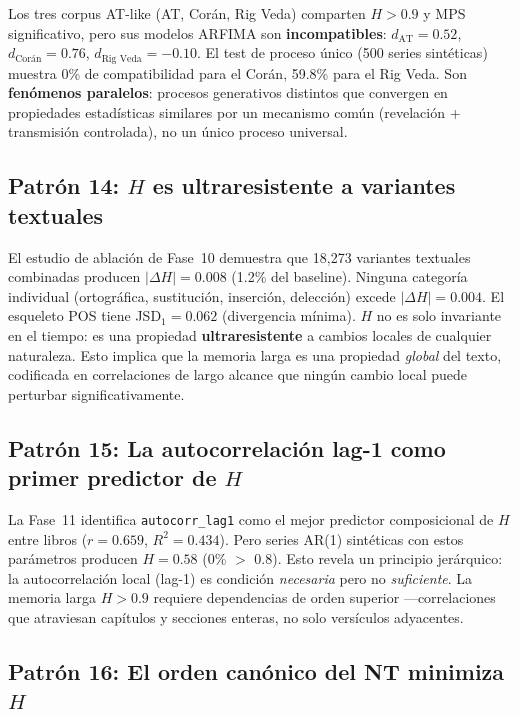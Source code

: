 \documentclass[12pt,a4paper]{article}
\begin{document}
Los tres corpus AT-like (AT, Cor\'an, Rig Veda) comparten $H > 0.9$ y MPS
significativo, pero sus modelos ARFIMA son \textbf{incompatibles}: $d_{\text{AT}} = 0.52$,
$d_{\text{Cor\'an}} = 0.76$, $d_{\text{Rig Veda}} = -0.10$. El test de proceso
\'unico (500 series sint\'eticas) muestra 0\% de compatibilidad para el Cor\'an,
59.8\% para el Rig Veda. Son \textbf{fen\'omenos paralelos}: procesos generativos
distintos que convergen en propiedades estad\'isticas similares por un mecanismo
com\'un (revelaci\'on + transmisi\'on controlada), no un \'unico proceso universal.


\subsection{Patr\'on 14: $H$ es ultraresistente a variantes textuales}

El estudio de ablaci\'on de Fase~10 demuestra que 18,273 variantes
textuales combinadas producen $|\Delta H| = 0.008$ (1.2\% del baseline).
Ninguna categor\'ia individual (ortogr\'afica, sustituci\'on, inserci\'on,
delecci\'on) excede $|\Delta H| = 0.004$. El esqueleto POS tiene
JSD$_1 = 0.062$ (divergencia m\'inima). $H$ no es solo invariante
en el tiempo: es una propiedad \textbf{ultraresistente} a cambios locales
de cualquier naturaleza. Esto implica que la memoria larga es una
propiedad \emph{global} del texto, codificada en correlaciones de largo
alcance que ning\'un cambio local puede perturbar significativamente.

\subsection{Patr\'on 15: La autocorrelaci\'on lag-1 como primer predictor de $H$}

La Fase~11 identifica \texttt{autocorr\_lag1} como el mejor predictor
composicional de $H$ entre libros ($r = 0.659$, $R^2 = 0.434$).
Pero series AR(1) sint\'eticas con estos par\'ametros producen
$H = 0.58$ (0\% $>$ 0.8). Esto revela un principio jer\'arquico:
la autocorrelaci\'on local (lag-1) es condici\'on \emph{necesaria}
pero no \emph{suficiente}. La memoria larga $H > 0.9$ requiere
dependencias de orden superior ---correlaciones que atraviesan
cap\'itulos y secciones enteras, no solo vers\'iculos adyacentes.

\subsection{Patr\'on 16: El orden can\'onico del NT minimiza $H$}
\end{document}
